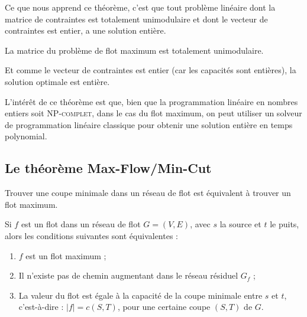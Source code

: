\documentclass[a4paper]{article}
\begin{document}
Ce que nous apprend ce théorème, c'est que tout problème linéaire dont la matrice de contraintes est totalement unimodulaire et dont le vecteur de contraintes est entier, a une solution entière.
\begin{theorem}
La matrice du problème de flot maximum est totalement unimodulaire.
\end{theorem}
Et comme le vecteur de contraintes est entier (car les capacités sont entières), la solution optimale est entière.

L'intérêt de ce théorème est que, bien que la programmation linéaire en nombres entiers soit \textsc{NP-complet}, dans le cas du flot maximum, on peut utiliser un solveur de programmation linéaire classique pour obtenir une solution entière en temps polynomial.
\subsection{Le théorème Max-Flow/Min-Cut}
Trouver une coupe minimale dans un réseau de flot est équivalent à trouver un flot maximum.
\begin{theorem}
	Si $f$ est un flot dans un réseau de flot $G = (V, E)$, avec $s$ la source et $t$ le puits, alors les conditions suivantes sont équivalentes :
	\begin{enumerate}
		\item $f$ est un flot maximum ;
		\item Il n'existe pas de chemin augmentant dans le réseau résiduel $G_f$ ;
		\item La valeur du flot est égale à la capacité de la coupe minimale entre $s$ et $t$, c'est-à-dire : $|f| = c(S, T)$, pour une certaine coupe $(S, T)$ de $G$.
	\end{enumerate}
\end{theorem}
\end{document}

